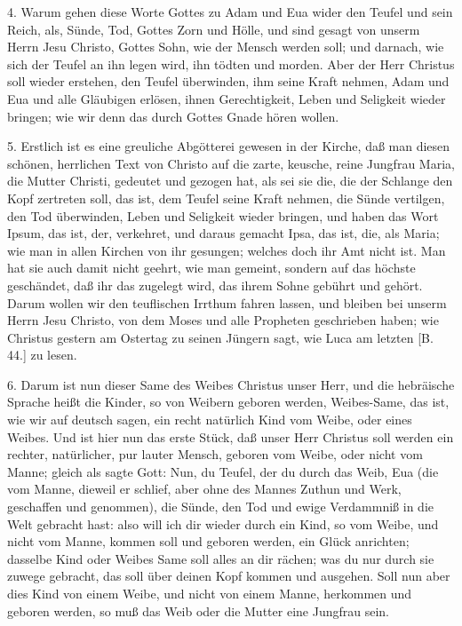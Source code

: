 4. Warum gehen diese Worte Gottes zu Adam und Eua wider den Teufel und sein Reich, als, Sünde, Tod, Gottes Zorn und Hölle, und sind gesagt von unserm Herrn Jesu Christo, Gottes Sohn, wie der Mensch werden soll; und darnach, wie sich der Teufel an ihn legen wird, ihn tödten und morden. Aber der Herr Christus soll wieder erstehen, den Teufel überwinden, ihm seine Kraft nehmen, Adam und Eua und alle Gläubigen erlösen, ihnen Gerechtigkeit, Leben und Seligkeit wieder bringen; wie wir denn das durch Gottes Gnade hören wollen.

5. Erstlich ist es eine greuliche Abgötterei gewesen in der Kirche, daß man diesen schönen, herrlichen Text von Christo auf die zarte, keusche, reine Jungfrau Maria, die Mutter Christi, gedeutet und gezogen hat, als sei sie die, die der Schlange den Kopf zertreten soll, das ist, dem Teufel seine Kraft nehmen, die Sünde vertilgen, den Tod überwinden, Leben und Seligkeit wieder bringen, und haben das Wort Ipsum, das ist, der, verkehret, und daraus gemacht Ipsa, das ist, die, als Maria; wie man in allen Kirchen von ihr gesungen; welches doch ihr Amt nicht ist. Man hat sie auch damit nicht geehrt, wie man gemeint, sondern auf das höchste geschändet, daß ihr das zugelegt wird, das ihrem Sohne gebührt und gehört. Darum wollen wir den teuflischen Irrthum fahren lassen, und bleiben bei unserm Herrn Jesu Christo, von dem Moses und alle Propheten geschrieben haben; wie Christus gestern am Ostertag zu seinen Jüngern sagt, wie Luca am letzten [B. 44.] zu lesen.

6. Darum ist nun dieser Same des Weibes Christus unser Herr, und die hebräische Sprache heißt die Kinder, so von Weibern geboren werden, Weibes-Same, das ist, wie wir auf deutsch sagen, ein recht natürlich Kind vom Weibe, oder eines Weibes. Und ist hier nun das erste Stück, daß unser Herr Christus soll werden ein rechter, natürlicher, pur lauter Mensch, geboren vom Weibe, oder nicht vom Manne; gleich als sagte Gott: Nun, du Teufel, der du durch das Weib, Eua (die vom Manne, dieweil er schlief, aber ohne des Mannes Zuthun und Werk, geschaffen und genommen), die Sünde, den Tod und ewige Verdammniß in die Welt gebracht hast: also will ich dir wieder durch ein Kind, so vom Weibe, und nicht vom Manne, kommen soll und geboren werden, ein Glück anrichten; dasselbe Kind oder Weibes Same soll alles an dir rächen; was du nur durch sie zuwege gebracht, das soll über deinen Kopf kommen und ausgehen. Soll nun aber dies Kind von einem Weibe, und nicht von einem Manne, herkommen und geboren werden, so muß das Weib oder die Mutter eine Jungfrau sein.

